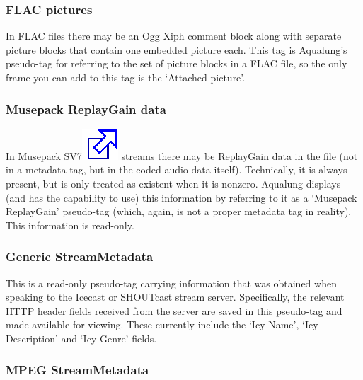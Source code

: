 \documentclass[10pt,english]{article}
\begin{document}
\subsubsection{FLAC pictures\label{idp795456}}



\noindent In FLAC files there may be an Ogg Xiph comment block
along with separate picture blocks that contain one embedded
picture each. This tag is Aqualung's pseudo-tag for
referring to the set of picture blocks in a FLAC file, so
the only frame you can add to this tag is the
`Attached picture'.




\subsubsection{Musepack ReplayGain data\label{idp797248}}



\noindent In \href{http://trac.musepack.net/trac/wiki/SV7Specification}{Musepack
SV7\includegraphics[scale=0.5]{external.eps}} streams there may be ReplayGain data in the file
(not in a metadata tag, but in the coded audio data
itself). Technically, it is always present, but is only
treated as existent when it is nonzero. Aqualung displays
(and has the capability to use) this information by
referring to it as a `Musepack ReplayGain' pseudo-tag
(which, again, is not a proper metadata tag in
reality). This information is read-only.





\subsubsection{Generic StreamMetadata\label{idp799936}}



\noindent This is a read-only pseudo-tag carrying information that
was obtained when speaking to the Icecast or SHOUTcast
stream server. Specifically, the relevant HTTP header fields
received from the server are saved in this pseudo-tag and
made available for viewing. These currently include the
`Icy-Name', `Icy-Description' and `Icy-Genre'
fields.




\subsubsection{MPEG StreamMetadata\label{idp802640}}
\end{document}
